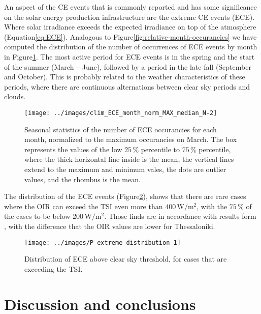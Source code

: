 \documentclass[preprint, 5p,
authoryear]{elsarticle} %
\begin{document}
An aspect of the CE events that is commonly reported and has some
significance on the solar energy production infrastructure are the
extreme CE events (ECE). Where solar irradiance exceeds the expected
irradiance on top of the atmosphere
(Equation\nobreakspace{}\ref{eq:ECE}). Analogous to
Figure\nobreakspace{}\ref{fig:relative-month-occurancies} we have
computed the distribution of the number of occurrences of ECE events by
month in Figure\nobreakspace{}\ref{fig:relative-month-occurancies-ECE}.
The most active period for ECE events is in the spring and the start of
the summer (March -- June), followed by a period in the late fall
(September and October). This is probably related to the weather
characteristics of these periods, where there are continuous
alternations between clear sky periods and clouds.

\begin{figure}

{\centering \texttt{[image: ../images/clim\_ECE\_month\_norm\_MAX\_median\_N-2]} 

}

\caption{Seasonal statistics of the number of ECE occurancies for each month, normalized to the maximum occurancies on March. The box represents the values of the low $25\,\%$ percentile to $75\,\%$ percentile, where the thick horizontal line inside is the mean, the vertical lines extend to the maximum and minimum vales, the dots are outlier values, and the rhombus is the mean.}\label{fig:relative-month-occurancies-ECE}
\end{figure}

The distribution of the ECE events
(Figure\nobreakspace{}\ref{fig:P-extreme-distribution}), shows that
there are rare cases where the OIR can exceed the TSI even more than
\(400\,\text{W}/\text{m}^2\), with the \(75\,\%\) of the cases to be
below \(200\,\text{W}/\text{m}^2\). Those finds are in accordance with
results form \citet{Vamvakas2020}, with the difference that the OIR
values are lower for Thessaloniki.

\begin{figure}

{\centering \texttt{[image: ../images/P-extreme-distribution-1]} 

}

\caption{Distribution of ECE above clear sky threshold, for cases that are exceeding the TSI.}\label{fig:P-extreme-distribution}
\end{figure}

\hypertarget{discussion-and-conclusions}{%
\section{Discussion and conclusions}\label{discussion-and-conclusions}}
\end{document}

